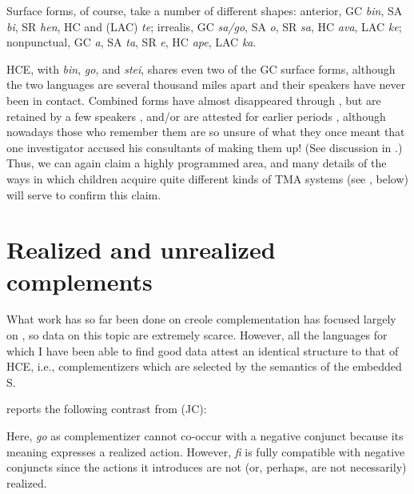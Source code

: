
Surface forms, of course, take a number of different shapes: 
anterior,
 GC \textit{bin}, 
 SA \textit{bi}, 
 SR \textit{hen}, 
 HC and  (LAC) \textit{te}; 
irrealis, 
 GC \textit{sa/go}, 
 SA \textit{o},
 SR \textit{sa}, 
 HC \textit{ava}, 
 LAC \textit{ke};
nonpunctual, 
 GC \textit{a}, 
 SA \textit{ta}, 
 SR \textit{e}, 
 HC \textit{ape}, 
 LAC \textit{ka}.

HCE, with \textit{bin}, \textit{go}, and \textit{stei}, shares even two of the GC surface forms, although the two languages are several thousand miles apart and their speakers have never been in contact. Combined forms have almost disappeared through , but are retained by a few speakers \citep{Bickerton1974}, and/or are attested for earlier periods \citep{Reinecke1969,Tsuzaki1971}, although nowadays those who remember them are so unsure of what they once meant that one investigator \citep{Perlman1973} accused his consultants of making them up! (See discussion in \citealt[183ff]{Bickerton1980}.) Thus, we can again claim a highly programmed area, and many details of the ways in which children acquire quite different\enlargethispage{1\baselineskip} kinds of TMA systems (see , below) will serve to confirm this claim.

\section{Realized and unrealized complements}

What work has so far been done on creole complementation has focused largely on , so data on this topic are extremely scarce. However, all the languages for which I have been able to find good data attest an identical structure to that of HCE, i.e., complementizers which are selected by the semantics of the embedded S.

\citet{Roberts1975} reports the following contrast from  (JC):

\z

\label{ex:2:28}\z
Here, \textit{go} as complementizer cannot co-occur with a negative conjunct because its meaning expresses a realized action. However, \textit{fi} is fully
compatible with negative conjuncts since the actions it introduces are not (or, perhaps, are not necessarily) realized.

